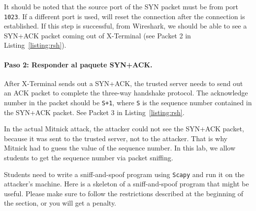 It should be noted that the source port of the SYN packet 
must be from port \texttt{1023}. If a different port 
is used, \rsh will reset the connection 
after the connection is established.  If this step is successful, 
from Wireshark, we should be
able to see a SYN+ACK packet coming out of 
X-Terminal (see Packet 2 in Listing~\ref{listing:rsh}).


\paragraph{Paso 2: Responder al paquete SYN+ACK.}
After X-Terminal sends out a SYN+ACK, the trusted server needs 
to send out an ACK packet to complete the three-way handshake protocol. 
The acknowledge number in the packet should be \texttt{S+1}, where 
\texttt{S} is the sequence number contained in the SYN+ACK packet. 
See Packet 3 in Listing~\ref{listing:rsh}.

In the actual Mitnick attack, the attacker could not see the SYN+ACK packet, because
it was sent to the trusted server, not to the attacker. 
That is why Mitnick had to guess the value of the sequence number.
In this lab, we allow students to get 
the sequence number via packet sniffing. 

Students need to write a sniff-and-spoof program using \texttt{Scapy} and run it
on the attacker's machine. Here is a skeleton of a sniff-and-spoof program that might be
useful. Please make sure to follow the restrictions described at the
beginning of the section, or you will get a penalty. 


